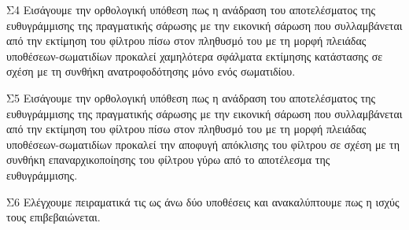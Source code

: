 \begin{bw_box}
\begin{customcontribution}{Σ4}
  \label{contribution:04}
  Εισάγουμε την ορθολογική υπόθεση πως η ανάδραση του αποτελέσματος της
  ευθυγράμμισης της πραγματικής σάρωσης με την εικονική σάρωση που συλλαμβάνεται
  από την εκτίμηση του φίλτρου πίσω στον πληθυσμό του με τη μορφή πλειάδας
  υποθέσεων-σωματιδίων προκαλεί χαμηλότερα σφάλματα εκτίμησης κατάστασης σε
  σχέση με τη συνθήκη ανατροφοδότησης μόνο ενός σωματιδίου.
\end{customcontribution}
\end{bw_box}

\begin{bw_box}
\begin{customcontribution}{Σ5}
  \label{contribution:05}
  Εισάγουμε την ορθολογική υπόθεση πως η ανάδραση του αποτελέσματος της
  ευθυγράμμισης της πραγματικής σάρωσης με την εικονική σάρωση που συλλαμβάνεται
  από την εκτίμηση του φίλτρου πίσω στον πληθυσμό του με τη μορφή πλειάδας
  υποθέσεων-σωματιδίων προκαλεί την αποφυγή απόκλισης του φίλτρου σε σχέση
  με τη συνθήκη επαναρχικοποίησης του φίλτρου γύρω από το αποτέλεσμα της
  ευθυγράμμισης.
\end{customcontribution}
\end{bw_box}

\begin{bw_box}
\begin{customcontribution}{Σ6}
  \label{contribution:06}
  Ελέγχουμε πειραματικά τις ως άνω δύο υποθέσεις και ανακαλύπτουμε πως η ισχύς
  τους επιβεβαιώνεται.
\end{customcontribution}
\end{bw_box}

